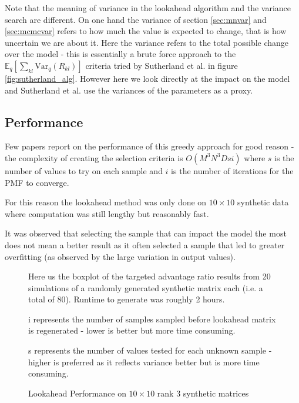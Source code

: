 Note that the meaning of variance in the lookahead algorithm and the variance search are different. On one hand the variance of section \ref{sec:mnvar} and \ref{sec:mcmcvar} refers to how much the value is expected to change, that is how uncertain we are about it. Here the variance refers to the total possible change over the model -  this is essentially a brute force approach to the $\mathbb{E}_q\left[ \sum\limits_{kl}\mathrm{Var}_q(R_{kl})\right]$ criteria tried by Sutherland et al. in figure \ref{fig:sutherland_alg}. However here we look directly at the impact on the model and Sutherland et al. use the variances of the parameters as a proxy.

\subsection{Performance}

Few papers report on the performance of this greedy approach for good reason - the complexity of creating the selection criteria is $O(M^3N^3Dsi)$ where $s$ is the number of values to try on each sample and $i$ is the number of iterations for the PMF to converge.

For this reason the lookahead method was only done on $10\times 10$ synthetic data where computation was still lengthy but reasonably fast.

It was observed that selecting the sample that can impact the model the most does not mean a better result as it often selected a sample that led to greater overfitting (as observed by the large variation in output values).

\begin{figure}[!htbp]
  \begin{center}
    \resizebox{\textwidth}{!}{}
  \end{center}
  Here us the boxplot of the targeted advantage ratio results from 20 simulations of a randomly generated synthetic matrix each (i.e. a total of 80). Runtime to generate was roughly 2 hours.
  
  i represents the number of samples sampled before lookahead matrix is regenerated - lower is better but more time consuming.
  
  s represents the number of values tested for each unknown sample - higher is preferred as it reflects variance better but is more time consuming.
    \caption{Lookahead Performance on $10\times 10$ rank 3 synthetic matrices}
    \label{fig:lookahead_boxplot}
\end{figure}

